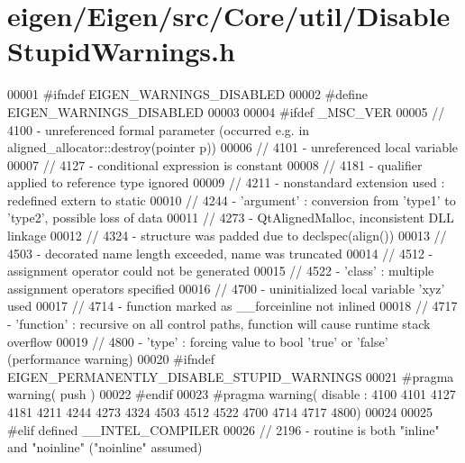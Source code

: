 \hypertarget{eigen_2_eigen_2src_2_core_2util_2_disable_stupid_warnings_8h_source}{}\section{eigen/\+Eigen/src/\+Core/util/\+Disable\+Stupid\+Warnings.h}
\label{eigen_2_eigen_2src_2_core_2util_2_disable_stupid_warnings_8h_source}

\begin{DoxyCode}
00001 \textcolor{preprocessor}{#ifndef EIGEN\_WARNINGS\_DISABLED}
00002 \textcolor{preprocessor}{#define EIGEN\_WARNINGS\_DISABLED}
00003 
00004 \textcolor{preprocessor}{#ifdef \_MSC\_VER}
00005   \textcolor{comment}{// 4100 - unreferenced formal parameter (occurred e.g. in aligned\_allocator::destroy(pointer p))}
00006   \textcolor{comment}{// 4101 - unreferenced local variable}
00007   \textcolor{comment}{// 4127 - conditional expression is constant}
00008   \textcolor{comment}{// 4181 - qualifier applied to reference type ignored}
00009   \textcolor{comment}{// 4211 - nonstandard extension used : redefined extern to static}
00010   \textcolor{comment}{// 4244 - 'argument' : conversion from 'type1' to 'type2', possible loss of data}
00011   \textcolor{comment}{// 4273 - QtAlignedMalloc, inconsistent DLL linkage}
00012   \textcolor{comment}{// 4324 - structure was padded due to declspec(align())}
00013   \textcolor{comment}{// 4503 - decorated name length exceeded, name was truncated}
00014   \textcolor{comment}{// 4512 - assignment operator could not be generated}
00015   \textcolor{comment}{// 4522 - 'class' : multiple assignment operators specified}
00016   \textcolor{comment}{// 4700 - uninitialized local variable 'xyz' used}
00017   \textcolor{comment}{// 4714 - function marked as \_\_forceinline not inlined}
00018   \textcolor{comment}{// 4717 - 'function' : recursive on all control paths, function will cause runtime stack overflow}
00019   \textcolor{comment}{// 4800 - 'type' : forcing value to bool 'true' or 'false' (performance warning)}
00020 \textcolor{preprocessor}{  #ifndef EIGEN\_PERMANENTLY\_DISABLE\_STUPID\_WARNINGS}
00021 \textcolor{preprocessor}{    #pragma warning( push )}
00022 \textcolor{preprocessor}{  #endif}
00023 \textcolor{preprocessor}{  #pragma warning( disable : 4100 4101 4127 4181 4211 4244 4273 4324 4503 4512 4522 4700 4714 4717 4800)}
00024 
00025 \textcolor{preprocessor}{#elif defined \_\_INTEL\_COMPILER}
00026   \textcolor{comment}{// 2196 - routine is both "inline" and "noinline" ("noinline" assumed)}

\end{DoxyCode}
